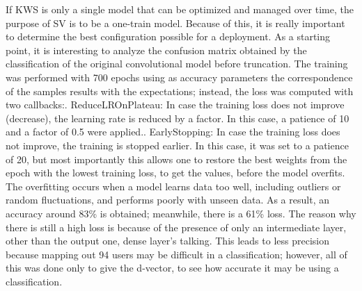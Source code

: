If KWS is only a single model that can be optimized and managed over time, the purpose of SV is to be a one-train model. Because of this, it is really important to determine the best configuration possible for a deployment. As a starting point, it is interesting to analyze the confusion matrix obtained by the classification of the original convolutional model before truncation. 
The training was performed with 700 epochs using as accuracy parameters the correspondence of the samples results with the expectations; instead, the loss was computed with two callbacks:. ReduceLROnPlateau: In case the training loss does not improve (decrease), the learning rate is reduced by a factor. In this case, a patience of 10 and a factor of 0.5 were applied.. EarlyStopping: In case the training loss does not improve, the training is stopped earlier. In this case, it was set to a patience of 20, but most importantly this allows one to restore the best weights from the epoch with the lowest training loss, to get the values, before the model overfits. The overfitting occurs when a model learns data too well, including outliers or random fluctuations, and performs poorly with unseen data.
As a result, an accuracy around 83\% is obtained; meanwhile, there is a 61\% loss. The reason why there is still a high loss is because of the presence of only an intermediate layer, other than the output one, dense layer's talking. This leads to less precision because mapping out 94 users may be difficult in a classification; however, all of this was done only to give the d-vector, to see how accurate it may be using a classification.

